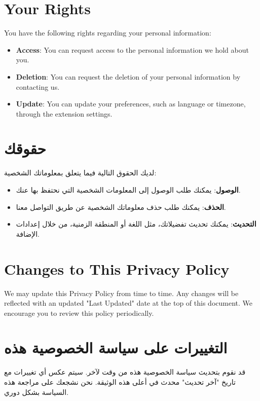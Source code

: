 \documentclass[12pt]{article}
\begin{document}
\section{Your Rights}
You have the following rights regarding your personal information:
\begin{itemize}
    \item \textbf{Access}: You can request access to the personal information we hold about you.
    \item \textbf{Deletion}: You can request the deletion of your personal information by contacting us.
    \item \textbf{Update}: You can update your preferences, such as language or timezone, through the extension settings.
\end{itemize}

\section*{\textarabic{حقوقك}}
\textarabic{لديك الحقوق التالية فيما يتعلق بمعلوماتك الشخصية:}
\begin{itemize}[label=\textarabic{•}]
    \item \textarabic{\textbf{الوصول}: يمكنك طلب الوصول إلى المعلومات الشخصية التي نحتفظ بها عنك.}
    \item \textarabic{\textbf{الحذف}: يمكنك طلب حذف معلوماتك الشخصية عن طريق التواصل معنا.}
    \item \textarabic{\textbf{التحديث}: يمكنك تحديث تفضيلاتك، مثل اللغة أو المنطقة الزمنية، من خلال إعدادات الإضافة.}
\end{itemize}

\section{Changes to This Privacy Policy}
We may update this Privacy Policy from time to time. Any changes will be reflected with an updated "Last Updated" date at the top of this document. We encourage you to review this policy periodically.

\section*{\textarabic{التغييرات على سياسة الخصوصية هذه}}
\textarabic{قد نقوم بتحديث سياسة الخصوصية هذه من وقت لآخر. سيتم عكس أي تغييرات مع تاريخ "آخر تحديث" محدث في أعلى هذه الوثيقة. نحن نشجعك على مراجعة هذه السياسة بشكل دوري.}
\end{document}
